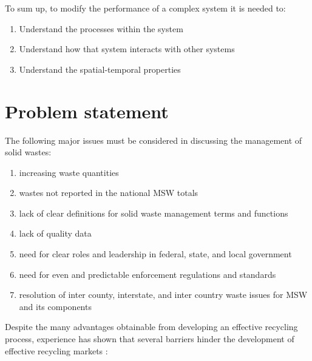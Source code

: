 To sum up, to modify the performance of a complex system it is needed to:


\begin{enumerate}
    \item Understand the processes within the system
    \item Understand how that system interacts with other systems
    \item Understand the spatial-temporal properties 
\end{enumerate}


\section{Problem statement}


The following major issues must be considered in discussing the management of solid wastes: \parencite{CDR2005}\par

\begin{enumerate}
    \item increasing waste quantities
    \item wastes not reported in the national MSW totals
    \item lack of clear definitions for solid waste management terms and functions
    \item lack of quality data
    \item need for clear roles and leadership in federal, state, and local government
    \item need for even and predictable enforcement regulations and standards
    \item resolution of inter county, interstate, and inter country waste issues for MSW and its components
\end{enumerate}


Despite the many advantages obtainable from developing an effective recycling process, experience has shown that several barriers hinder the development of effective recycling markets \parencite{CDR2005}:

